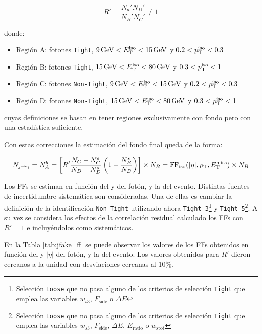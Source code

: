 \begin{equation}
  R' = \frac{N_a' N_D'}{N_B' N_C'} \neq 1
\end{equation}

\noindent
donde:
\begin{itemize}
  \item Región A: fotones \texttt{Tight}, $9\,\text{GeV}<E_{\text{T}}^{\text{iso}}<15\,\text{GeV}$ y $0.2<p_{\text{T}}^{\text{iso}}<0.3$
  \item Región B: fotones \texttt{Tight}, $15\,\text{GeV}<E_{\text{T}}^{\text{iso}}<80\,\text{GeV}$ y $0.3<p_{\text{T}}^{\text{iso}}<1$
  \item Región C: fotones \texttt{Non-Tight}, $9\,\text{GeV}<E_{\text{T}}^{\text{iso}}<15\,\text{GeV}$ y $0.2<p_{\text{T}}^{\text{iso}}<0.3$
  \item Región D: fotones \texttt{Non-Tight}, $15\,\text{GeV}<E_{\text{T}}^{\text{iso}}<80\,\text{GeV}$ y $0.3<p_{\text{T}}^{\text{iso}}<1$
\end{itemize}

\noindent
cuyas definiciones se basan en tener regiones exclusivamente con fondo pero con una estadística suficiente.

Con estas correcciones la estimación del fondo final queda de la forma:

\begin{equation}
    N_{j\to\gamma} = N_A^b = \left[R' \frac{N_C - N_C^s}{N_D - N_D^s} \left( 1 - \frac{N_B^s}{N_B} \right)  \right] \times N_B = \text{FF}_{\text{iso}}(|\eta|, p_{\text{T}}, E_{\text{T}}^{\text{miss}}) \times N_B \\
\end{equation}

Los FFs se estiman en función del \pt y \absEta del fotón, y la \met del evento. Distintas fuentes de incertidumbre sistemática son consideradas. 
Una de ellas es cambiar la definición de la identificación \texttt{Non-Tight} utilizando ahora \texttt{Tight-3}\footnote{Selección \texttt{Loose} que no pasa alguno de los criterios de selección \texttt{Tight} que emplea las variables $w_{s3}$, $F_{\text{side}}$ o $\Delta E$} y \texttt{Tight-5}\footnote{Selección \texttt{Loose} que no pasa alguno de los criterios de selección \texttt{Tight} que emplea las variables $w_{s3}$, $F_{\text{side}}$, $\Delta E$, $E_{\text{ratio}}$ o $w_{\text{stot}}$}. A su vez se considera los efectos de la correlación residual calculado los FFs con $R'=1$ e incluyéndolos como sistemáticos.

En la Tabla \ref{tab:jfake_ff} se puede observar los valores de los FFs obtenidos en función del \pt y $|\eta|$ del fotón, y la \met del evento. Los valores obtenidos para $R'$ dieron cercanos a la unidad con desviaciones cercanas al 10\%.

